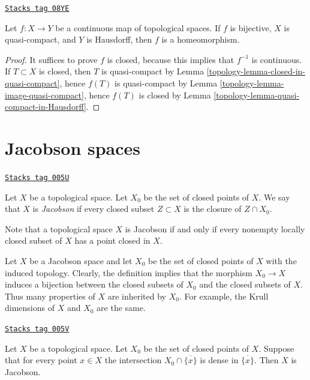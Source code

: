 \begin{lemma}
\label{topology-lemma-bijective-map}
\href{https://stacks.math.columbia.edu/tag/08YE}{\texttt{Stacks tag 08YE}}

Let $f : X \to Y$ be a continuous map of topological spaces.
If $f$ is bijective, $X$ is quasi-compact, and $Y$ is Hausdorff,
then $f$ is a homeomorphism.
\end{lemma}

\begin{proof}

It suffices to prove $f$ is closed, because this implies that
$f^{-1}$ is continuous. If $T \subset X$ is closed, then $T$
is quasi-compact by Lemma \ref{topology-lemma-closed-in-quasi-compact},
hence $f(T)$ is quasi-compact by Lemma \ref{topology-lemma-image-quasi-compact},
hence $f(T)$ is closed by Lemma \ref{topology-lemma-quasi-compact-in-Hausdorff}.
\end{proof}

\section{Jacobson spaces}
\label{topology-section-space-jacobson}
\begin{definition}
\label{topology-definition-space-jacobson}
\href{https://stacks.math.columbia.edu/tag/005U}{\texttt{Stacks tag 005U}}

Let $X$ be a topological space.
Let $X_0$ be the set of closed points of $X$.
We say that $X$ is {\it Jacobson} if every
closed subset $Z \subset X$ is the closure
of $Z \cap X_0$.
\end{definition}

Note that a topological space $X$ is Jacobson if and only if
every nonempty locally closed subset of $X$
has a point closed in $X$.

\medskip\noindent
Let $X$ be a Jacobson space and let $X_0$ be the set
of closed points of $X$ with the induced topology.
Clearly, the definition implies that the morphism
$X_0 \to X$ induces a bijection between the closed
subsets of $X_0$ and the closed subsets of $X$.
Thus many properties of $X$ are inherited by $X_0$.
For example, the Krull dimensions of $X$ and $X_0$
are the same.

\begin{lemma}
\label{topology-lemma-jacobson-check-irreducible-closed}
\href{https://stacks.math.columbia.edu/tag/005V}{\texttt{Stacks tag 005V}}

Let $X$ be a topological space. Let $X_0$ be the set
of closed points of $X$.
Suppose that for every point $x\in X$
the intersection $X_0 \cap \overline{\{x\}}$ is dense in $\overline{\{x\}}$.
Then $X$ is Jacobson.
\end{lemma}

